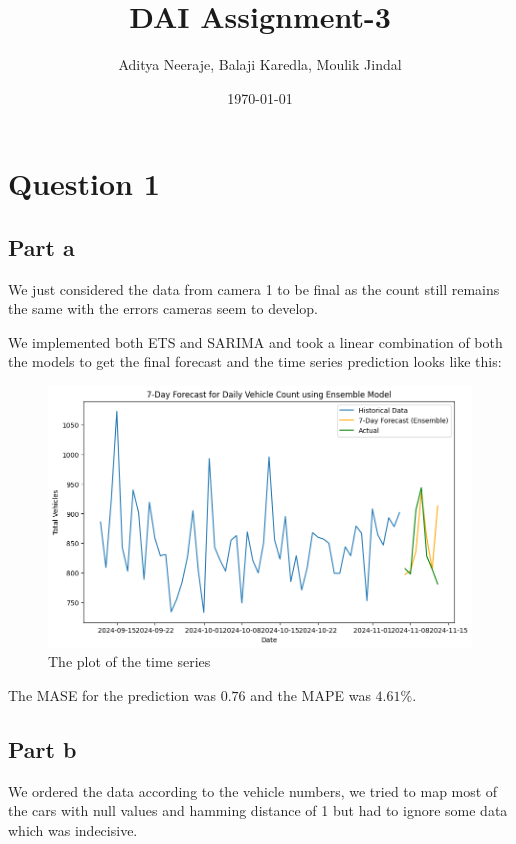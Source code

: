 \documentclass{article}
\title{DAI Assignment-3}
\author{Aditya Neeraje,  Balaji Karedla,  Moulik Jindal}
\date{\today}
\begin{document}
\maketitle
\tableofcontents


\newpage


\section{Question 1}

\subsection{Part a}

We just considered the data from camera 1 to be final as the count still remains the same with the errors cameras seem to develop.

We implemented both ETS and SARIMA and took a linear combination of both the models to get the final forecast and the time series prediction looks like this:

\begin{figure}[H]
\centering
\includegraphics[width=\textwidth]{1a_image.png}
\caption{The plot of the time series}
\end{figure}

The MASE for the prediction was $0.76$ and the MAPE was $4.61\%$.

\subsection{Part b}

We ordered the data according to the vehicle numbers, we tried to map most of the cars with null values and hamming distance of 1 but had to ignore some data which was indecisive.
\end{document}
